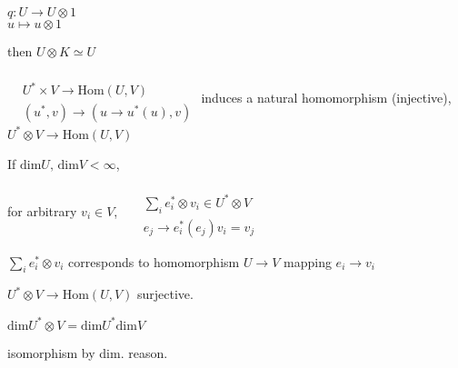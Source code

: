 $q: U \to U\otimes 1$ \\
$u \mapsto u\otimes 1$

then $U\otimes K \simeq U$


 $\begin{aligned} & \quad \\
  & U^* \times V \to \text{Hom}{(U,V)} \\
  & (u^*, v) \to ( u \to u^*(u), v) \end{aligned}$ induces a natural homomorphism (injective), $U^* \otimes V \to \text{Hom}{(U,V)}$ 

If $\text{dim}{U}, \, \text{dim}{V} < \infty$, 

for arbitrary $v_i \in V$, \, $\begin{aligned} & \quad \\
  & \sum_i e_i^* \otimes v_i \in U^* \otimes V \\
  & e_j \to e_i^*(e_j)v_i = v_j \end{aligned}$ 

$\sum_i e_i^* \otimes v_i$ corresponds to homomorphism $U\to V$ mapping $e_i \to v_i$ 

$U^* \otimes V \to \text{Hom}{(U,V)}$ surjective.  

$\text{dim}{U^* \otimes V} = \text{dim}{U^*} \text{dim}{V}$

isomorphism by dim. reason. 

